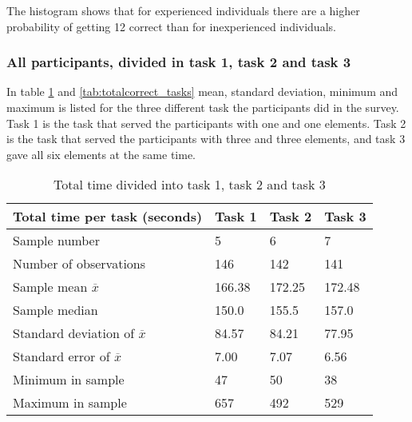 The histogram shows that for experienced individuals there are a higher probability of getting 12 correct than for inexperienced individuals. 

\subsubsection{All participants, divided in task 1, task 2 and task 3}\label{sec:taskdivided_all}

In table \ref{tab:totaltime_tasks} and \ref{tab:totalcorrect_tasks} mean, standard deviation, minimum and maximum is listed for the three different task the participants did in the survey. Task 1 is the task that served the participants with one and one elements. Task 2 is the task that served the participants with three and three elements, and task 3 gave all six elements at the same time. 

\begin{table}[H]
	\centering
	\begin{tabular}{l|l|l|l}
		Total time per task (seconds) & Task 1 & Task 2 & Task 3 \\ \hline
		Sample number & 5  & 6  & 7    \\
		Number of observations & 146    & 142      & 141     \\
		Sample mean $\overline{x}$  & 166.38  &  172.25   &   172.48  \\
		Sample median & 150.0  &  155.5  & 157.0  \\
		Standard deviation of $\overline{x}$   & 84.57  & 84.21  & 77.95   \\
		Standard error of $\overline{x}$   & 7.00 & 7.07 & 6.56 \\
		Minimum in sample    & 47  & 50 &   38   \\
		Maximum in sample   & 657 & 492  & 529 \\ \hline
	\end{tabular}
	\caption[Total time, divided into task 1, 2 and 3]{Total time divided into task 1, task 2 and task 3}
	\label{tab:totaltime_tasks}
\end{table}

